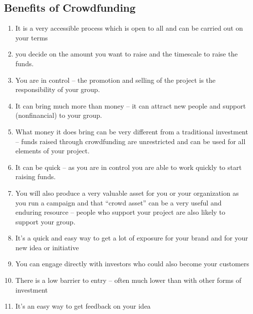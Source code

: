 \subsection*{ Benefits of Crowdfunding }
\begin{enumerate}
      \item It is a very accessible process which is open to all and can be carried out on your terms
      \item you decide on the amount you want to raise and the timescale to raise the funds.
      \item You are in control – the promotion and selling of the project is the responsibility of your group.
      \item It can bring much more than money – it can attract new people and support (nonfinancial) to your group.
      \item What money it does bring can be very different from a traditional investment – funds raised through crowdfunding are unrestricted and can be used for all elements of your project.
      \item It can be quick – as you are in control you are able to work quickly to start raising funds.
      \item You will also produce a very valuable asset for you or your organization as you run a campaign and that “crowd asset” can be a very useful and enduring resource – people who support your project are also likely to support your group.
      \item It’s a quick and easy way to get a lot of exposure for your brand and for your new idea or initiative
      \item You can engage directly with investors who could also become your customers
      \item There is a low barrier to entry – often much lower than with other forms of investment
      \item It’s an easy way to get feedback on your idea
\end{enumerate}


